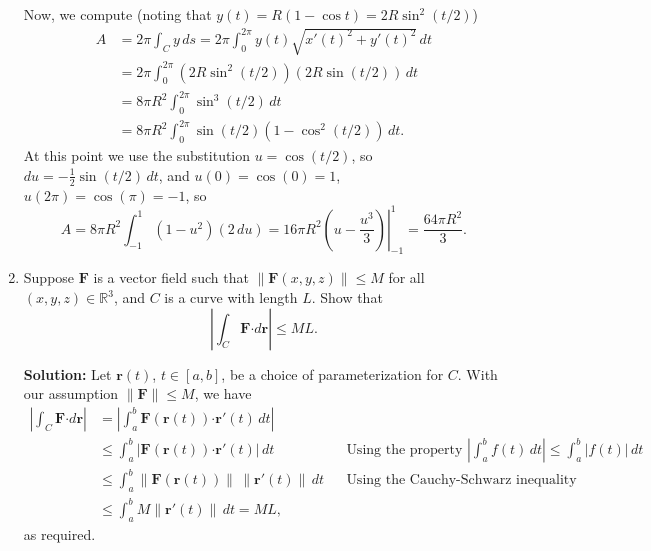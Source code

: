 \documentclass[letterpaper,12pt]{article}
\newcommand{\R}{\mathbb{R}}
\newcommand{\F}{\mathbf{F}}
\newcommand{\dotp}{\boldsymbol{\cdot}}
\renewcommand{\r}{\mathbf{r}}
\begin{document}
\begin{enumerate}
Now, we compute (noting that $y(t) = R(1-\cos t) = 2R\sin^2(t/2)$)
\begin{align*}
 A & = 2\pi\int_C y\,ds = 2\pi\int_0^{2\pi}y(t)\sqrt{x'(t)^2+y'(t)^2}\,dt\\
 & = 2\pi\int_0^{2\pi}(2R\sin^2(t/2))(2R\sin(t/2))\,dt\\
 & = 8\pi R^2\int_0^{2\pi}\sin^3(t/2)\,dt\\
 & = 8\pi R^2\int_0^{2\pi}\sin(t/2)(1-\cos^2(t/2))\,dt.
\end{align*}
At this point we use the substitution $u=\cos(t/2)$, so $du = -\frac{1}{2}\sin(t/2)\,dt$, and $u(0)=\cos(0)=1$, $u(2\pi) = \cos(\pi) = -1$, so
\[
 A = 8\pi R^2 \int_{-1}^1 (1-u^2)(2\,du) = 16\pi R^2 \left.\left(u-\frac{u^3}{3}\right)\right|_{-1}^1 = \frac{64\pi R^2}{3}.
\]




\item Suppose $\F$ is a vector field such that $\lVert \F(x,y,z)\rVert\leq M$ for all $(x,y,z)\in\R^3$, and $C$ is a curve with length $L$. Show that
\[
 \left\lvert \int_C \F\dotp d\mathbf{r}\right\rvert \leq ML.
\]

\textbf{Solution:} Let $\r(t)$, $t\in [a,b]$, be a choice of parameterization for $C$. With our assumption $\lVert \F\rVert \leq M$, we have
\begin{align*}
 \left\lvert \int_C \F\dotp d\mathbf{r}\right\rvert & = \left\lvert \int_a^b \F(\r(t))\dotp \r'(t)\,dt\right\rvert & &\\
 & \leq \int_a^b \lvert \F(\r(t))\dotp \r'(t)\rvert \,dt & &\text{Using the property $\left\lvert \int_a^b f(t)\,dt\right\rvert \leq \int_a^b \lvert f(t)\rvert\,dt$}\\
 & \leq \int_a^b \lVert \F(\r(t))\rVert \,\lVert \r'(t)\rVert \,dt & & \text{Using the Cauchy-Schwarz inequality}\\
 & \leq \int_a^b M\lVert \r'(t)\rVert\,dt = ML,
\end{align*}
as required.


\end{enumerate}
\end{document}
